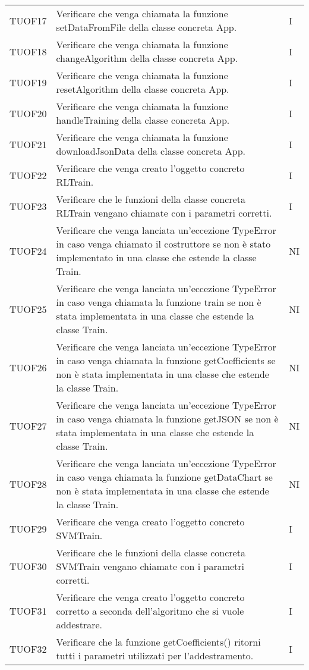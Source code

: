 \begin{longtable}{C{2cm} L{8cm} C{2cm}}
TUOF17 & Verificare che venga chiamata la funzione setDataFromFile della classe concreta App. & I \\
TUOF18 & Verificare che venga chiamata la funzione changeAlgorithm della classe concreta App. & I \\
TUOF19 & Verificare che venga chiamata la funzione resetAlgorithm della classe concreta App. & I \\
TUOF20 & Verificare che venga chiamata la funzione handleTraining della classe concreta App. & I \\
TUOF21 & Verificare che venga chiamata la funzione downloadJsonData della classe concreta App. & I \\
TUOF22 & Verificare che venga creato l’oggetto concreto RLTrain. & I \\
TUOF23 & Verificare che le funzioni della classe concreta RLTrain vengano chiamate con i parametri corretti. & I \\
TUOF24 & Verificare che venga lanciata un’eccezione TypeError in caso venga chiamato il costruttore se non è stato implementato in una classe che estende la classe Train.& NI \\
TUOF25 & Verificare che venga lanciata un’eccezione TypeError in caso venga chiamata la funzione train se non è stata implementata in una classe che estende la classe Train.& NI \\
TUOF26 & Verificare che venga lanciata un’eccezione TypeError in caso venga chiamata la funzione getCoefficients se non è stata implementata in una classe che estende la classe Train. & NI \\
TUOF27 & Verificare che venga lanciata un’eccezione TypeError in caso venga chiamata la funzione getJSON se non è stata implementata in una classe che estende la classe Train.& NI \\
TUOF28 & Verificare che venga lanciata un’eccezione TypeError in caso venga chiamata la funzione getDataChart se non è stata implementata in una classe che estende la classe Train.& NI \\
TUOF29 & Verificare che venga creato l’oggetto concreto SVMTrain. & I \\
TUOF30 & Verificare che le funzioni della classe concreta SVMTrain vengano chiamate con i parametri corretti. & I \\
TUOF31 & Verificare che venga creato l’oggetto concreto corretto a seconda dell’algoritmo che si vuole addestrare. & I \\
TUOF32 & Verificare che la funzione getCoefficients() ritorni tutti i parametri utilizzati per l’addestramento. & I \\

\end{longtable}
